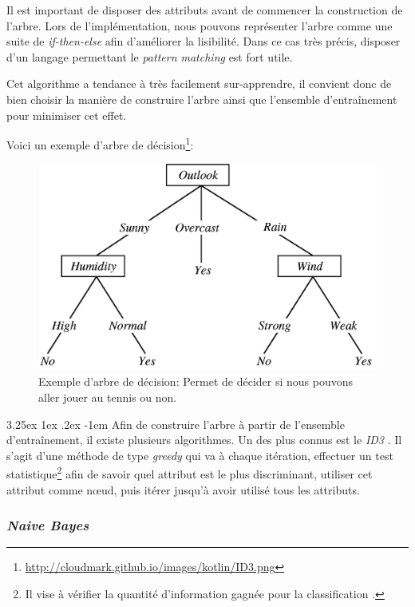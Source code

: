 \documentclass[a4paper, 11pt]{article}
\makeatletter
\renewcommand\paragraph{\@startsection{paragraph}{5}{\z@}%
  {3.25ex \@plus1ex \@minus.2ex}%
  {-1em}%
  {\normalfont\normalsize\bfseries}}
\makeatother
\begin{document}
Il est important de disposer des attributs avant de commencer la construction de l'arbre. Lors de l'implémentation, nous pouvons représenter l'arbre comme une suite de \textit{if-then-else} afin d'améliorer la lisibilité. Dans ce cas très précis, disposer d'un langage permettant le \textit{pattern matching} est fort utile.

Cet algorithme a tendance à très facilement sur-apprendre, il convient donc de bien choisir la manière de construire l'arbre ainsi que l'ensemble d'entraînement pour minimiser cet effet. 

Voici un exemple d'arbre de décision\footnote{\url{http://cloudmark.github.io/images/kotlin/ID3.png}}:
\begin{figure}[h!]
\centering
\includegraphics{images/exemple_tree}
\caption{Exemple d'arbre de décision: Permet de décider si nous pouvons aller jouer au tennis ou non.}
\end{figure}

\paragraph{}
Afin de construire l'arbre à partir de l'ensemble d'entraînement, il existe plusieurs algorithmes. Un des plus connus est le \textit{ID3} \cite{id3}. Il s'agit d'une méthode de type \textit{greedy} qui va à chaque itération, effectuer un test statistique\footnote{Il vise à vérifier la quantité d'information gagnée pour la classification \cite{id3}.} afin de savoir quel attribut est le plus discriminant, utiliser cet attribut comme nœud, puis itérer jusqu'à avoir utilisé tous les attributs.


\subsubsection{\textit{Naive Bayes}}\label{section naive bayes}
\end{document}

